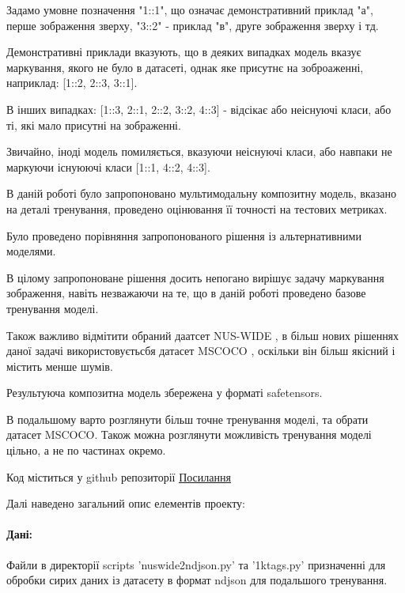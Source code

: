 \documentclass{udstu}
\begin{document}
Задамо умовне позначення "1::1", що означає демонстративний приклад "а", перше зображення зверху,
"3::2" - приклад "в", друге зображення зверху і тд.

Демонстративні приклади вказують, що в деяких випадках модель вказує маркування, якого не було
в датасеті, однак яке присутнє на зоброаженні, наприклад: [1::2, 2::3, 3::1].

В інших випадках: [1::3, 2::1, 2::2, 3::2, 4::3] - відсікає або неіснуючі класи, або ті, які
мало присутні на зображенні.

Звичайно, іноді модель помиляється, вказуючи неіснуючі класи, або навпаки не маркуючи існуюючі класи
[1::1, 4::2, 4::3].

\conclusions

В даній роботі було запропоновано мультимодальну композитну модель, вказано на деталі тренування,
проведено оцінювання її точності на тестових метриках.

Було проведено порівняння запропонованого рішення із альтернативними моделями.

В цілому запропоноване рішення досить непогано вирішує задачу маркування зображення,
навіть незважаючи на те, що в даній роботі проведено базове тренування моделі.

Також важливо відмітити обраний даатсет NUS-WIDE \cite{nus-wide-civr09}, в більш нових
рішеннях даної задачі використовуєтьсбя датасет MSCOCO \cite{cocodataset}, оскільки він більш якісний
і містить менше шумів.

Результуюча композитна модель збережена у форматі safetensors.

В подальшому варто розглянути більш точне тренування моделі, та обрати датасет MSCOCO.
Також можна розглянути можливість тренування моделі цільно, а не по частинах окремо.

\printbibliography


Код міститься у github репозиторії \underline{\href{https://github.com/skorodenko/wallpaper\_tagging}{Посилання}}

Далі наведено загальний опис елементів проекту:


\paragraph{\textbf{Дані:}\\}

Файли в директорії scripts 'nuswide2ndjson.py' та '1ktags.py' призначенні для обробки
сирих даних із датасету в формат ndjson для подальшого тренування.
\end{document}
